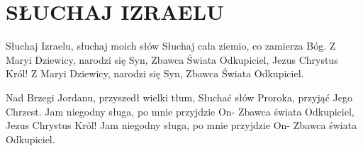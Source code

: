 \documentclass[../../../songbook.tex]{subfiles}
\begin{document}
\TabPositions{8cm} %
\section*{SŁUCHAJ IZRAELU}
{}
\vspace{0.5cm}
Słuchaj Izraelu, słuchaj moich słów				 \newline
Słuchaj cała ziemio, co zamierza Bóg.			 \newline
Z Maryi Dziewicy, narodzi się Syn,				 \newline
Zbawca Świata Odkupiciel, Jezus Chrystus Król!	 \newline
\-\hspace{1cm}Z Maryi Dziewicy, narodzi się Syn,	 \newline
\-\hspace{1cm}Zbawca Świata Odkupiciel.				 \newline

Nad Brzegi Jordanu, przyszedł wielki tłum,		\newline
Słuchać słów Proroka, przyjąć Jego Chrzest.		\newline
Jam niegodny sługa, po mnie przyjdzie On-		\newline
Zbawca świata Odkupiciel, Jezus Chrystus Król!	\newline
\-\hspace{1cm}Jam niegodny sługa, po mnie przyjdzie On-	\newline
\-\hspace{1cm}Zbawca świata Odkupiciel.		\newline
\end{document}
